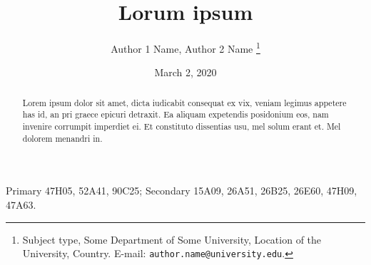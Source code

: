 \documentclass[12pt]{article}
\begin{document}
\title{{\selectfont Lorum ipsum}}

\author{
    Author 1 Name, Author 2 Name
    \thanks{
        Subject type, Some Department of Some University, Location of the University,
        Country. E-mail: \texttt{author.name@university.edu}.
    }
}

\date{March 2, 2020}

\maketitle
{}

\begin{abstract} 
    \noindent
    Lorem ipsum dolor sit amet, dicta iudicabit consequat ex vix, veniam legimus appetere has id, an pri graece epicuri detraxit. Ea aliquam expetendis posidonium eos, nam invenire corrumpit imperdiet ei. Et constituto dissentias usu, mel solum erant et. Mel dolorem menandri in.
\end{abstract}

Primary 47H05, 52A41, 90C25; Secondary 15A09, 26A51, 26B25, 26E60, 47H09, 47A63.


\end{document}
